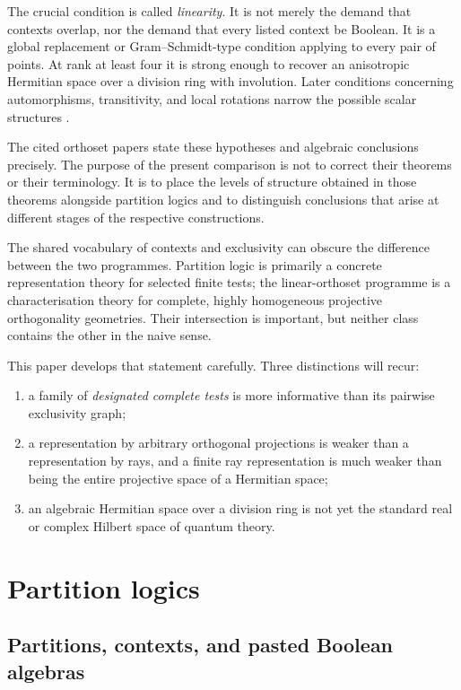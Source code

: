 \documentclass[
  aps,
  pra,
  twocolumn,
  amsmath,
  amssymb,
  longbibliography,
  nofootinbib,
  floatfix
]{revtex4-2}
\begin{document}
The crucial condition is called \emph{linearity}.  It is not merely the demand
that contexts overlap, nor the demand that every listed context be Boolean.
It is a global replacement or Gram--Schmidt-type condition applying to every
pair of points.  At rank at least four it is strong enough to recover an
anisotropic Hermitian space over a division ring with involution.  Later
conditions concerning automorphisms, transitivity, and local rotations narrow
the possible scalar structures
\cite{Vetterlein2021Gradual,Vetterlein2022Transitivity,
KorbelarPasekaVetterlein2025}.

The cited orthoset papers state these hypotheses and algebraic conclusions
precisely.  The purpose of the present comparison is not to correct their
theorems or their terminology.  It is to place the levels of structure obtained
in those theorems alongside partition logics and to distinguish conclusions
that arise at different stages of the respective constructions.

The shared vocabulary of contexts and exclusivity can obscure the difference
between the two programmes.  Partition logic is primarily a concrete
representation theory for selected finite tests; the linear-orthoset programme
is a characterisation theory for complete, highly homogeneous projective
orthogonality geometries.  Their intersection is important, but neither class
contains the other in the naive sense.

This paper develops that statement carefully.  Three distinctions will recur:
\begin{enumerate}
\item a family of \emph{designated complete tests} is more informative than its
pairwise exclusivity graph;
\item a representation by arbitrary orthogonal projections is weaker than a
representation by rays, and a finite ray representation is much weaker than
being the entire projective space of a Hermitian space;
\item an algebraic Hermitian space over a division ring is not yet the standard
real or complex Hilbert space of quantum theory.
\end{enumerate}

\section{Partition logics}
\label{sec:partition}

\subsection{Partitions, contexts, and pasted Boolean algebras}
\end{document}
